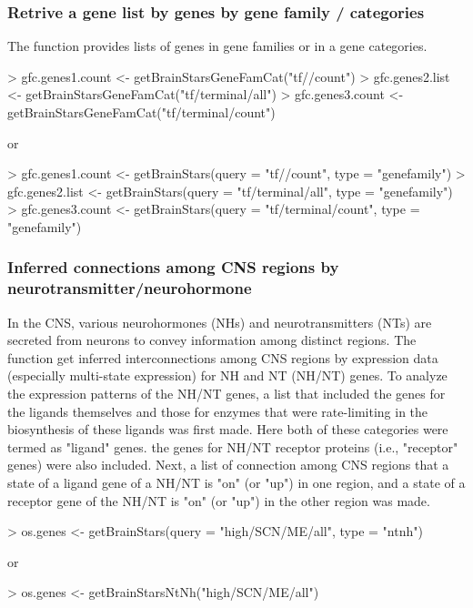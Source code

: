 \documentclass[12pt,fullpage]{article}
\begin{document}
\subsubsection{Retrive a gene list by genes by gene family / categories}
The function provides lists of genes in gene families or in a gene categories. 
\begin{Schunk}
\begin{Sinput}
> gfc.genes1.count <- getBrainStarsGeneFamCat("tf//count")
> gfc.genes2.list  <- getBrainStarsGeneFamCat("tf/terminal/all")
> gfc.genes3.count <- getBrainStarsGeneFamCat("tf/terminal/count")
\end{Sinput}
\end{Schunk}
or
\begin{Schunk}
\begin{Sinput}
> gfc.genes1.count <- getBrainStars(query = "tf//count",         type = "genefamily")
> gfc.genes2.list  <- getBrainStars(query = "tf/terminal/all",   type = "genefamily")
> gfc.genes3.count <- getBrainStars(query = "tf/terminal/count", type = "genefamily")
\end{Sinput}
\end{Schunk}

\subsubsection{Inferred connections among CNS regions by neurotransmitter/neurohormone}
In the CNS, various neurohormones (NHs) and neurotransmitters (NTs) are secreted from neurons to convey information among distinct regions. The function get inferred interconnections among CNS regions by expression data (especially multi-state expression) for NH and NT (NH/NT) genes. To analyze the expression patterns of the NH/NT genes, a list that included the genes for the ligands themselves and those for enzymes that were rate-limiting in the biosynthesis of these ligands was first made. Here both of these categories were termed as "ligand" genes. the genes for NH/NT receptor proteins (i.e., "receptor" genes) were also included. Next, a list of connection among CNS regions that a state of a ligand gene of a NH/NT is "on" (or "up") in one region, and a state of a receptor gene of the NH/NT is "on" (or "up") in the other region was made.
\begin{Schunk}
\begin{Sinput}
> os.genes <- getBrainStars(query = "high/SCN/ME/all", type = "ntnh")
\end{Sinput}
\end{Schunk}
or
\begin{Schunk}
\begin{Sinput}
> os.genes <- getBrainStarsNtNh("high/SCN/ME/all")
\end{Sinput}
\end{Schunk}
\end{document}

